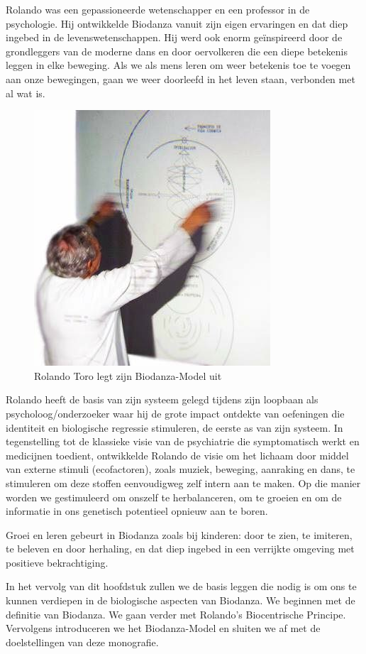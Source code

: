\documentclass[
  11pt,
]{book}
\begin{document}
Rolando was een gepassioneerde wetenschapper en een professor in de psychologie. Hij ontwikkelde Biodanza vanuit zijn eigen ervaringen en dat diep ingebed in de levenswetenschappen. Hij werd ook enorm geïnspireerd door de grondleggers van de moderne dans en door oervolkeren die een diepe betekenis leggen in elke beweging. Als we als mens leren om weer betekenis toe te voegen aan onze bewegingen, gaan we weer doorleefd in het leven staan, verbonden met al wat is.

\begin{figure}

{\centering \includegraphics[width=0.45\linewidth]{./figs/rolandoAndModel} 

}

\caption{Rolando Toro legt zijn Biodanza-Model uit}\label{fig:rolandoModel}
\end{figure}

Rolando heeft de basis van zijn systeem gelegd tijdens zijn loopbaan als psycholoog/onderzoeker waar hij de grote impact ontdekte van oefeningen die identiteit en biologische regressie stimuleren, de eerste as van zijn systeem. In tegenstelling tot de klassieke visie van de psychiatrie die symptomatisch werkt en medicijnen toedient, ontwikkelde Rolando de visie om het lichaam door middel van externe stimuli (ecofactoren), zoals muziek, beweging, aanraking en dans, te stimuleren om deze stoffen eenvoudigweg zelf intern aan te maken. Op die manier worden we gestimuleerd om onszelf te herbalanceren, om te groeien en om de informatie in ons genetisch potentieel opnieuw aan te boren.

Groei en leren gebeurt in Biodanza zoals bij kinderen: door te zien, te imiteren, te beleven en door herhaling, en dat diep ingebed in een verrijkte omgeving met positieve bekrachtiging.

In het vervolg van dit hoofdstuk zullen we de basis leggen die nodig is om ons te kunnen verdiepen in de biologische aspecten van Biodanza. We beginnen met de definitie van Biodanza. We gaan verder met Rolando's Biocentrische Principe. Vervolgens introduceren we het Biodanza-Model en sluiten we af met de doelstellingen van deze monografie.
\end{document}
